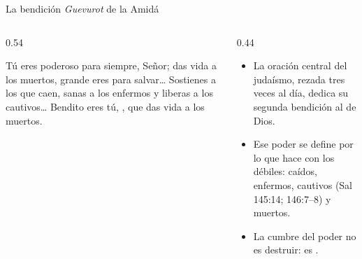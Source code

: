 \begin{frame}{La bendición \emph{Guevurot} de la Amidá}
\begin{columns}[t,onlytextwidth]
\begin{column}{0.54\textwidth}
\begin{cita}[colback=dorado!10!papiro,colframe=dorado!80!azul]Tú eres poderoso para siempre, Señor; das vida a los muertos, grande eres para salvar\ldots{} Sostienes a los que caen, sanas a los enfermos y liberas a los cautivos\ldots{} Bendito eres tú, \SENOR, que das vida a los muertos.\end{cita}
\begin{center}\scriptsize{}\end{center}
\end{column}
\begin{column}{0.44\textwidth}\small
\begin{itemize}
\item La oración central del judaísmo, rezada tres veces al día, dedica su segunda bendición al  de Dios.
\item Ese poder se define por lo que hace con los débiles: caídos, enfermos, cautivos (Sal 145:14; 146:7--8) y muertos.
\item La cumbre del poder no es destruir: es .
\end{itemize}
\end{column}
\end{columns}
\end{frame}

